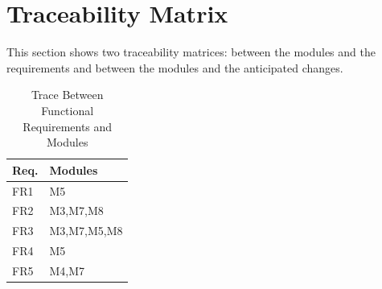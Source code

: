 \documentclass[12pt, titlepage]{article}
\begin{document}
\section{Traceability Matrix} \label{SecTM}

This section shows two traceability matrices: between the modules and the
requirements and between the modules and the anticipated changes.

\begin{table}[H]
\centering
\begin{tabular}{p{} p{}}
\toprule
\textbf{Req.} & \textbf{Modules}\\
\midrule
FR1 & M5\\
FR2 & M3,M7,M8\\
FR3 & M3,M7,M5,M8\\
FR4 & M5\\
FR5 & M4,M7\\
\bottomrule
\end{tabular}
\caption{Trace Between Functional Requirements and Modules}
\label{TblRT}
\end{table}
\end{document}
